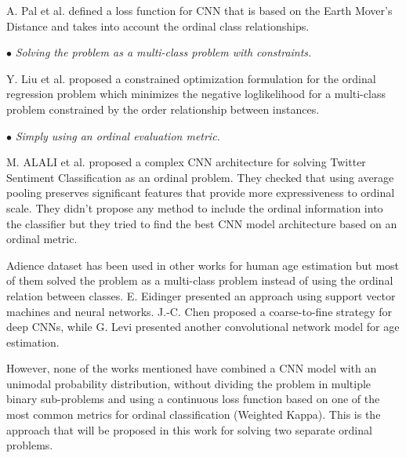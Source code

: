 \documentclass[journal]{IEEEtran}
\begin{document}
	A. Pal et al. \cite{pal2018severity} defined a loss function for CNN that is based on the Earth Mover's Distance and takes into account the ordinal class relationships.
	
	
	\vspace{0.2cm}
	$\bullet$ \textit{Solving the problem as a multi-class problem with constraints.}
	
	Y. Liu et al. \cite{liu2018constrained} proposed a constrained optimization formulation for the ordinal regression problem which minimizes the negative loglikelihood for a multi-class problem constrained by the order relationship between instances.
	
	
	\vspace{0.2cm}
	$\bullet$ \textit{Simply using an ordinal evaluation metric.}
	
	M. ALALI et al. \cite{alali2018multi} proposed a complex CNN architecture for solving Twitter Sentiment Classification as an ordinal problem. They checked that using average pooling preserves significant features that provide more expressiveness to ordinal scale. They didn't propose any method to include the ordinal information into the classifier but they tried to find the best CNN model architecture based on an ordinal metric.

	Adience dataset has been used in other works for human age estimation but most of them solved the problem as a multi-class problem instead of using the ordinal relation between classes. E. Eidinger \cite{eidinger2014age} presented an approach using support vector machines and neural networks. J.-C. Chen \cite{chen2016cascaded} proposed a coarse-to-fine strategy for deep CNNs, while G. Levi \cite{levi2015age} presented another convolutional network model for age estimation.

	However, none of the works mentioned have combined a CNN model with an unimodal probability distribution, without dividing the problem in multiple binary sub-problems and using a continuous loss function based on one of the most common metrics for ordinal classification (Weighted Kappa). This is the approach that will be proposed in this work for solving two separate ordinal problems.
	
\end{document}
